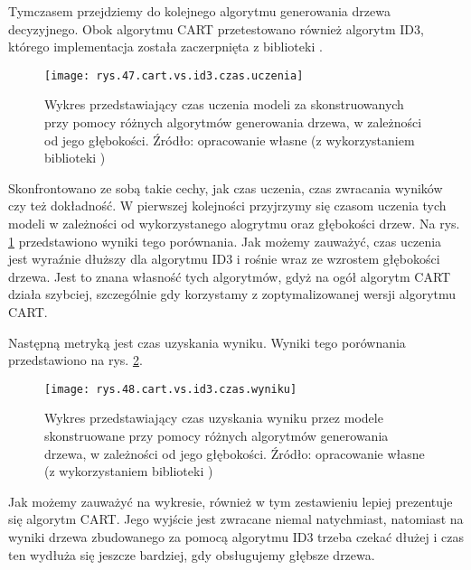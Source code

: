Tymczasem przejdziemy do kolejnego algorytmu generowania drzewa decyzyjnego. Obok algorytmu CART przetestowano również algorytm ID3, którego implementacja została zaczerpnięta z biblioteki . 
\begin{figure}[h]
    \centering
    \texttt{[image: rys.47.cart.vs.id3.czas.uczenia]}
    \caption{Wykres przedstawiający czas uczenia modeli za skonstruowanych przy pomocy różnych algorytmów generowania drzewa, w zależności od jego głębokości. Źródło: opracowanie własne (z wykorzystaniem biblioteki )}
    \label{rys.47.cart.vs.id3.czas.uczenia}
\end{figure}
Skonfrontowano ze sobą takie cechy, jak czas uczenia, czas zwracania wyników czy też dokładność. W pierwszej kolejności przyjrzymy się czasom uczenia tych modeli w zależności od wykorzystanego alogrytmu oraz głębokości drzew. Na rys. \ref{rys.47.cart.vs.id3.czas.uczenia} przedstawiono wyniki tego porównania.
Jak możemy zauważyć, czas uczenia jest wyraźnie dłuższy dla algorytmu ID3 i rośnie wraz ze wzrostem głębokości drzewa. Jest to znana własność tych algorytmów, gdyż na ogół algorytm CART działa szybciej, szczególnie gdy korzystamy z zoptymalizowanej wersji algorytmu CART. 

Następną metryką jest czas uzyskania wyniku. Wyniki tego porównania przedstawiono na rys. \ref{rys.48.cart.vs.id3.czas.wyniku}. 
\begin{figure}[h]
    \centering
    \texttt{[image: rys.48.cart.vs.id3.czas.wyniku]}
    \caption{Wykres przedstawiający czas uzyskania wyniku przez modele skonstruowane przy pomocy różnych algorytmów generowania drzewa, w zależności od jego głębokości. Źródło: opracowanie własne (z wykorzystaniem biblioteki )}
    \label{rys.48.cart.vs.id3.czas.wyniku}
\end{figure}
Jak możemy zauważyć na wykresie, również w tym zestawieniu lepiej prezentuje się algorytm CART. Jego wyjście jest zwracane niemal natychmiast, natomiast na wyniki drzewa zbudowanego za pomocą algorytmu ID3 trzeba czekać dłużej i czas ten wydłuża się jeszcze bardziej, gdy obsługujemy głębsze drzewa. 

